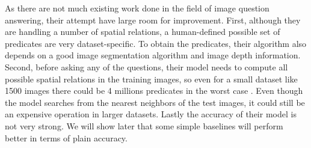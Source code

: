 \documentclass{article}
\renewcommand{\#}[1]{\textbf{#1}}
\begin{document}
As there are not much existing work done in the field of image question answering, their attempt have large room for improvement. First, although they are handling a number of spatial relations, a human-defined possible set of predicates are very dataset-specific. To obtain the predicates, their algorithm also depends on a good image segmentation algorithm and image depth information. Second, before asking any of the questions, their model needs to compute all possible spatial relations in the training images, so even for a small dataset like 1500 images there could be 4 millions predicates in the worst case \cite{malinowski14b}. Even though the model searches from the nearest neighbors of the test images, it could still be an expensive operation in larger datasets. Lastly the accuracy of their model is not very strong. We will show later that some simple baselines will perform better in terms of plain accuracy.
\end{document}

